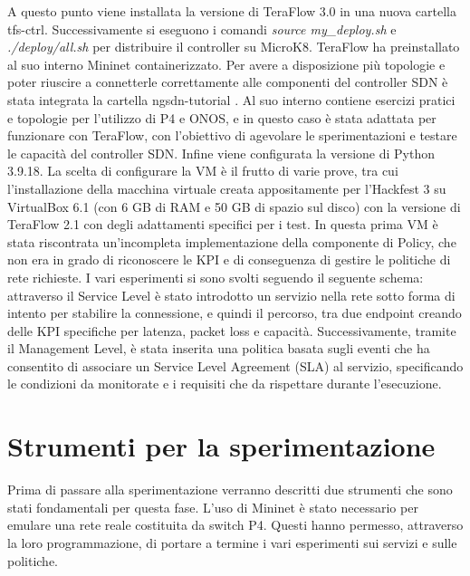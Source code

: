A questo punto viene installata la versione di TeraFlow 3.0 in una nuova cartella tfs-ctrl.
Successivamente si eseguono i comandi \textit{source my\_deploy.sh} e \textit{./deploy/all.sh} per distribuire il controller su MicroK8.
TeraFlow ha preinstallato al suo interno Mininet containerizzato.
Per avere a disposizione più topologie e poter riuscire a connetterle correttamente alle componenti del controller SDN è stata integrata
la cartella ngsdn-tutorial \cite{ngsdn}. 
Al suo interno contiene esercizi pratici e topologie per l'utilizzo di P4 e ONOS, e in questo caso è stata adattata per funzionare con TeraFlow, 
con l'obiettivo di agevolare le sperimentazioni e testare le capacità del controller SDN. 
Infine viene configurata la versione di Python 3.9.18.
\newline La scelta di configurare la VM è il frutto di varie prove, tra cui l'installazione della macchina virtuale creata appositamente per l'Hackfest 3
su VirtualBox 6.1 (con 6 GB di RAM e 50 GB di spazio sul disco) con la versione di TeraFlow 2.1 con degli adattamenti specifici per i test.
In questa prima VM è stata riscontrata un'incompleta implementazione della componente di Policy, che non era in grado di riconoscere le KPI e di conseguenza di gestire le politiche di rete richieste.
\newline I vari esperimenti si sono svolti seguendo il seguente schema:
attraverso il Service Level è stato introdotto un servizio nella rete sotto forma di intento per stabilire la connessione, e quindi il percorso, tra due endpoint creando delle KPI 
specifiche per latenza, packet loss e capacità. 
Successivamente, tramite il Management Level, è stata inserita una politica basata sugli eventi che ha consentito di associare un Service Level Agreement (SLA) al servizio,
specificando le condizioni da monitorate e i requisiti che da rispettare durante l'esecuzione.
\section{Strumenti per la sperimentazione}
Prima di passare alla sperimentazione verranno descritti due strumenti che sono stati fondamentali per questa fase.
L'uso di Mininet è stato necessario per emulare una rete reale costituita da switch P4.
Questi hanno permesso, attraverso la loro programmazione, di portare a termine i vari esperimenti sui 
servizi e sulle politiche.

